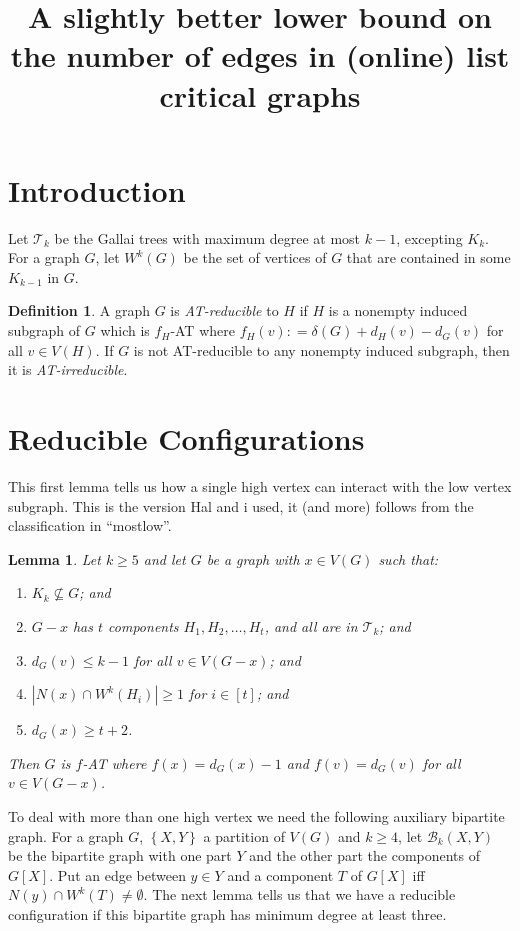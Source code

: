 \documentclass[12pt]{article}
\title{A slightly better lower bound on the number of edges in (online) list critical graphs}
\theoremstyle{plain}
\newtheorem{lem}[thm]{Lemma}
\theoremstyle{definition}
\newtheorem{defn}{Definition}
\theoremstyle{remark}
\newcommand{\fancy}[1]{\mathcal{#1}}
\newcommand{\T}{\fancy{T}}
\newcommand{\B}{\fancy{B}}
\newcommand{\set}[1]{\left\{ #1 \right\}}
\newcommand{\card}[1]{\left|#1\right|}
\newcommand{\irange}[1]{\left[#1\right]}
\newcommand{\DefinedAs}{\mathrel{\mathop:}=}
\begin{document}
\maketitle

\section{Introduction}
Let $\T_k$ be the Gallai trees with maximum degree at most $k-1$, excepting $K_k$. For a graph $G$, let $W^k(G)$ be the set of vertices of $G$ that are contained in some $K_{k-1}$ in $G$.  

\begin{defn}
	A graph $G$ is \emph{AT-reducible} to $H$ if $H$ is a nonempty induced subgraph of $G$ which is $f_H$-AT where $f_H(v) \DefinedAs \delta(G) + d_H(v) - d_G(v)$ for all $v \in V(H)$.  
	If $G$ is not AT-reducible to any nonempty induced subgraph, then it is \emph{AT-irreducible}.
\end{defn}

\section{Reducible Configurations}


This first lemma tells us how a single high vertex can interact with the low vertex subgraph.  This is the version Hal and i used, it (and more) follows from the classification in ``mostlow''.

\begin{lem}\label{ConfigurationTypeOneEuler}
Let $k \ge 5$ and let $G$ be a graph with $x \in V(G)$ such that:
\begin{enumerate}
\item $K_k \not \subseteq G$; and
\item $G-x$ has $t$ components $H_1, H_2, \ldots, H_t$, and all are in $\T_k$; and
\item $d_G(v) \leq k - 1$ for all $v \in V(G-x)$; and
\item $\card{N(x) \cap W^k(H_i)} \ge 1$ for $i \in \irange{t}$; and
\item $d_G(x) \ge t+2$.
\end{enumerate}

\noindent Then $G$ is $f$-AT where $f(x) = d_G(x) - 1$ and $f(v) = d_G(v)$ for all $v \in V(G - x)$.
\end{lem}

To deal with more than one high vertex we need the following auxiliary bipartite graph.  For a graph $G$, $\set{X, Y}$ a partition of $V(G)$ and $k \ge 4$, let $\B_k(X, Y)$ be the bipartite graph with one part $Y$ and the other part the components of $G[X]$.  Put an edge between $y \in Y$ and a component $T$ of $G[X]$ iff $N(y) \cap W^k(T) \ne \emptyset$.   The next lemma tells us that we have a reducible configuration if this bipartite graph has minimum degree at least three.  
\end{document}
